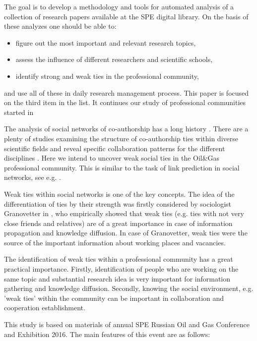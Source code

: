 \documentclass[12pt]{report}
\theoremstyle{definition}
\begin{document}
The goal is to develop a methodology and tools for automated analysis of a collection of research papers available at the SPE digital library.
On the basis of these analyzes one should be able to:
\begin{itemize}
	\item figure out the most important and relevant research topics,
	\item assess the influence of different researchers and scientific schools,
	\item identify strong and weak ties in the professional community, \end{itemize}
and use all of these in daily research management process.
This paper is focused on the third item in the list. It continues our study of professional communities started in 
\cite{KrYav_BI,krasnov2013comparison,krasnov2014connectivity,krasnov2014indicators,barysheva2015profiling,barysheva2015building,sofia2017structure}

The analysis of social networks  of co-authorship has a long history \cite{hou2008structure}. There are a plenty of studies examining the structure of co-authorship ties within diverse scientific fields and reveal specific collaboration patterns for the different disciplines \cite{acedo2006co,barabasi2002evolution,ding2011scientific,newman2001structure,rodriguez2008relationship}.
Here we intend to uncover weak social ties in the Oil\&Gas professional community. This is similar to the task of link prediction in social networks, see e.g. \cite{wang2015link}.

Weak ties within social networks is one of the key concepts. The idea of the differentiation of ties by their strength was firstly considered by sociologist Granovetter in \cite{granovetter1973strength}, who empirically showed that weak ties (e.g. ties with not very close friends and relatives) are of a great importance in case of information propagation and knowledge diffusion. In case of Granovetter, weak ties were the source of the important information about working places and vacancies.

The identification of weak ties within a professional community has a great practical importance. Firstly, identification of people who are working on the same topic and substantial research idea is very important for information gathering and knowledge diffusion. Secondly, knowing the social environment, e.g. 'weak ties' within the community can be important in collaboration and cooperation establishment. 

This study is based on materials of annual SPE Russian Oil and Gas Conference and Exhibition 2016. 
The main features of this event are as follows:
\end{document}

